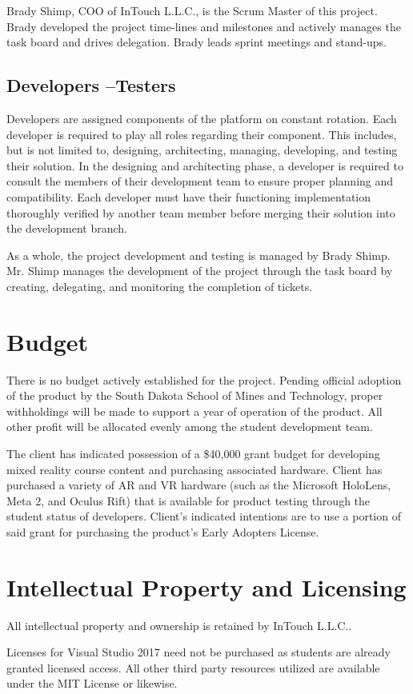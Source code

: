 Brady Shimp, COO of InTouch L.L.C., is the Scrum Master of this project. Brady developed the project time-lines and milestones and actively manages the task board and drives delegation. Brady leads sprint meetings and stand-ups. 

\subsection{Developers --Testers}

Developers are assigned components of the platform on constant rotation. Each developer is required to play all roles regarding their component. This includes, but is not limited to, designing, architecting, managing, developing, and testing their solution. In the designing and architecting phase, a developer is required to consult the members of their development team to ensure proper planning and compatibility. Each developer must have their functioning implementation thoroughly verified by another team member before merging their solution into the development branch. 

As a whole, the project development and testing is managed by Brady Shimp. Mr. Shimp manages the development of the project through the task board by creating, delegating, and monitoring the completion of tickets. 

\section{Budget}

There is no budget actively established for the project. Pending official adoption of the product by the South Dakota School of Mines and Technology, proper withholdings will be made to support a year of operation of the product. All other profit will be allocated evenly among the student development team. 

The client has indicated possession of a \$40,000 grant budget for developing mixed reality course content and purchasing associated hardware. Client has purchased a variety of AR and VR hardware (such as the Microsoft HoloLens, Meta 2, and Oculus Rift) that is available for product testing through the student status of developers. Client's indicated intentions are to use a portion of said grant for purchasing the product's Early Adopters License. 

\section{Intellectual Property and Licensing}

All intellectual property and ownership is retained by InTouch L.L.C.. 

Licenses for Visual Studio 2017 need not be purchased as students are already granted licensed access. All other third party resources utilized are available under the MIT License or likewise. 

